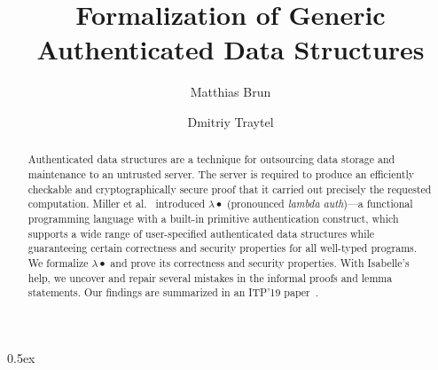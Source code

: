 \documentclass[10pt,a4paper]{article}
\begin{document}
\title{Formalization of Generic Authenticated Data Structures}
\author{Matthias Brun \and Dmitriy Traytel}

\maketitle

\begin{abstract} Authenticated data structures are a technique for outsourcing data storage and maintenance to an untrusted server.
The server is required to produce an efficiently checkable and cryptographically secure proof that it carried out precisely the
requested computation. Miller et al.~\cite{adsg} introduced $\lambda\bullet$ (pronounced \emph{lambda auth})---a functional
programming language with a built-in primitive authentication construct, which supports a wide range of user-specified authenticated
data structures while guaranteeing certain correctness and security properties for all well-typed programs.
%
We formalize $\lambda\bullet$ and prove its correctness and security properties. With Isabelle's help, we uncover and repair several
mistakes in the informal proofs and lemma statements. Our findings are summarized in an ITP'19 paper~\cite{gadsf}.
\end{abstract}

\tableofcontents

\parindent 0pt\parskip 0.5ex





\end{document}
